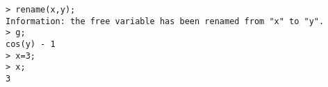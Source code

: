 \begin{center}\begin{minipage}{15cm}\begin{Verbatim}[frame=single]
> rename(x,y);
Information: the free variable has been renamed from "x" to "y".
> g;
cos(y) - 1
> x=3;
> x;
3
\end{Verbatim}
\end{minipage}\end{center}
